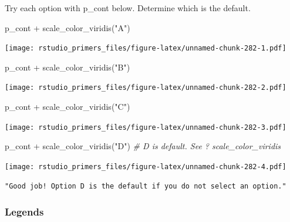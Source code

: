 \documentclass[
]{article}
\newenvironment{Shaded}{\begin{snugshade}}{\end{snugshade}}
\newcommand{\CommentTok}[1]{\textcolor[rgb]{0.56,0.35,0.01}{\textit{#1}}}
\newcommand{\FunctionTok}[1]{\textcolor[rgb]{0.00,0.00,0.00}{#1}}
\newcommand{\NormalTok}[1]{#1}
\newcommand{\SpecialCharTok}[1]{\textcolor[rgb]{0.00,0.00,0.00}{#1}}
\newcommand{\StringTok}[1]{\textcolor[rgb]{0.31,0.60,0.02}{#1}}
\begin{document}
Try each option with p\_cont below. Determine which is the default.

\begin{Shaded}
\begin{Highlighting}[]
\NormalTok{p\_cont }\SpecialCharTok{+} \FunctionTok{scale\_color\_viridis}\NormalTok{(}\StringTok{"A"}\NormalTok{)}
\end{Highlighting}
\end{Shaded}

\texttt{[image: rstudio\_primers\_files/figure-latex/unnamed-chunk-282-1.pdf]}

\begin{Shaded}
\begin{Highlighting}[]
\NormalTok{p\_cont }\SpecialCharTok{+} \FunctionTok{scale\_color\_viridis}\NormalTok{(}\StringTok{"B"}\NormalTok{)}
\end{Highlighting}
\end{Shaded}

\texttt{[image: rstudio\_primers\_files/figure-latex/unnamed-chunk-282-2.pdf]}

\begin{Shaded}
\begin{Highlighting}[]
\NormalTok{p\_cont }\SpecialCharTok{+} \FunctionTok{scale\_color\_viridis}\NormalTok{(}\StringTok{"C"}\NormalTok{)}
\end{Highlighting}
\end{Shaded}

\texttt{[image: rstudio\_primers\_files/figure-latex/unnamed-chunk-282-3.pdf]}

\begin{Shaded}
\begin{Highlighting}[]
\NormalTok{p\_cont }\SpecialCharTok{+} \FunctionTok{scale\_color\_viridis}\NormalTok{(}\StringTok{"D"}\NormalTok{)  }\CommentTok{\# D is default. See ? scale\_color\_viridis}
\end{Highlighting}
\end{Shaded}

\texttt{[image: rstudio\_primers\_files/figure-latex/unnamed-chunk-282-4.pdf]}

\begin{verbatim}
"Good job! Option D is the default if you do not select an option."
\end{verbatim}

\hypertarget{legends}{%
\subsubsection{Legends}\label{legends}}
\end{document}
